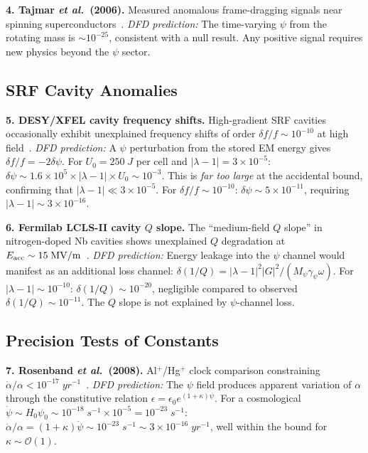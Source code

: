 \documentclass[twocolumn,superscriptaddress,prd]{revtex4-2}
\newcommand{\etal}{\textit{et al.}}
\newcommand{\order}[1]{\mathcal{O}(#1)}
\begin{document}
\textbf{4. Tajmar \etal\ (2006).} Measured anomalous frame-dragging
signals near spinning superconductors~\cite{Tajmar2006}.
\textit{DFD prediction:} The time-varying $\psi$ from the
rotating mass is $\sim 10^{-25}$, consistent with a null
result.  Any positive signal requires new physics beyond
the $\psi$ sector.

\subsection{SRF Cavity Anomalies}

\textbf{5. DESY/XFEL cavity frequency shifts.} High-gradient
SRF cavities occasionally exhibit unexplained frequency shifts
of order $\delta f/f \sim 10^{-10}$ at high field~\cite{Aune2000}.
\textit{DFD prediction:} A $\psi$ perturbation from the
stored EM energy gives $\delta f/f = -2\delta\psi$. For
$U_0 = 250\;\si{J}$ per cell and $|\lambda-1| = 3\times10^{-5}$:
$\delta\psi \sim 1.6\times10^5 \times |\lambda-1| \times U_0
\sim 10^{-3}$. This is \emph{far too large} at the accidental
bound, confirming that $|\lambda-1| \ll 3\times10^{-5}$.
For $\delta f/f \sim 10^{-10}$: $\delta\psi \sim 5\times10^{-11}$,
requiring $|\lambda-1| \sim 3\times10^{-16}$.

\textbf{6. Fermilab LCLS-II cavity $Q$ slope.} The ``medium-field
$Q$ slope'' in nitrogen-doped Nb cavities shows unexplained
$Q$ degradation at $E_{\rm acc} \sim 15\;\si{MV/m}$~\cite{Grassellino2017}.
\textit{DFD prediction:} Energy leakage into the $\psi$ channel
would manifest as an additional loss channel:
$\delta(1/Q) = |\lambda-1|^2 |G|^2/(M_\psi\gamma_\psi\omega)$.
For $|\lambda-1| \sim 10^{-10}$: $\delta(1/Q) \sim 10^{-20}$,
negligible compared to observed $\delta(1/Q) \sim 10^{-11}$.
The $Q$ slope is not explained by $\psi$-channel loss.

\subsection{Precision Tests of Constants}

\textbf{7. Rosenband \etal\ (2008).} Al$^+$/Hg$^+$ clock comparison
constraining $\dot{\alpha}/\alpha < 10^{-17}\;\si{yr^{-1}}$~\cite{Rosenband2008}.
\textit{DFD prediction:} The $\psi$ field produces apparent
variation of $\alpha$ through the constitutive relation
$\epsilon = \epsilon_0 e^{(1+\kappa)\psi}$. For a cosmological
$\dot\psi \sim H_0 \psi_0 \sim 10^{-18}\;\si{s^{-1}} \times 10^{-5}
= 10^{-23}\;\si{s^{-1}}$: $\dot\alpha/\alpha = (1+\kappa)\dot\psi
\sim 10^{-23}\;\si{s^{-1}} \sim 3\times10^{-16}\;\si{yr^{-1}}$,
well within the bound for $\kappa \sim \order{1}$.
\end{document}
